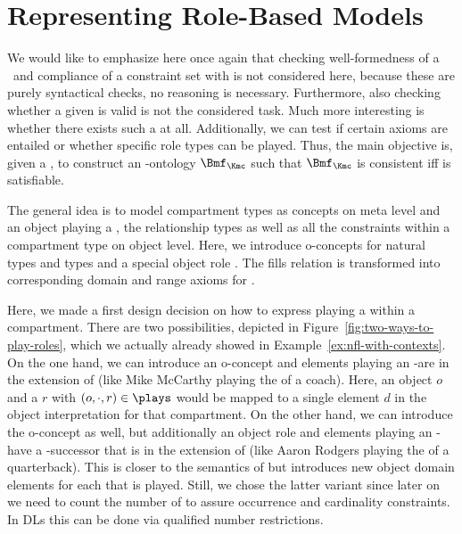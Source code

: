 \section{Representing Role-Based Models}
\label{sec:representating-role-based-models}

We would like to emphasize here once again that checking well-formedness of a \SCROM{}~\Mmc and
compliance of a constraint set with \Mmc is not considered here, because these are purely
syntactical checks, no reasoning is necessary. Furthermore, also checking whether a given \SCROI is
valid is not the considered task. Much more interesting is whether there exists such a \SCROI at
all. Additionally, we can test if certain axioms are entailed or whether specific role types can be
played. Thus, the main objective is, given a \SCCROM{} \Kmc, to construct an \LMLO-ontology
$\Bmf_{\Kmc}$ such that $\Bmf_{\Kmc}$ is consistent iff \Kmc is satisfiable.

The general idea is to model compartment types as concepts on meta level and an object playing a
\rosirole, the relationship types as well as all the constraints within a compartment type on object
level. Here, we introduce o-concepts for natural types and \rosirole types and a special object role
\plays. The fills relation is transformed into corresponding domain and range axioms for \plays.

Here, we made a first design decision on how to express playing a \rosirole within a
compartment. There are two possibilities, depicted in Figure~\ref{fig:two-ways-to-play-roles}, which
we actually already showed in Example~\ref{ex:nfl-with-contexts}. On the one hand, we can introduce
an o-concept \rt and elements playing an \rt-\rosirole are in the extension of \rt (like Mike
McCarthy playing the \rosirole of a coach). Here, an object $o$ and a \rosirole $r$ with
$(o,\cdot,r)\in\plays$ would be mapped to a single element $d$ in the object interpretation for that
compartment. On the other hand, we can introduce the o-concept \rt as well, but additionally an
object role \plays and elements playing an \rt-\rosirole have a \plays-successor that is in the extension
of \rt (like Aaron Rodgers playing the \rosirole of a quarterback).  This is closer to the semantics
of  but introduces new object domain elements for each \rosirole that is played.  Still, we
chose the latter variant since later on we need to count the number of \rosiroles to assure
occurrence and cardinality constraints. In DLs this can be done via qualified number restrictions.

